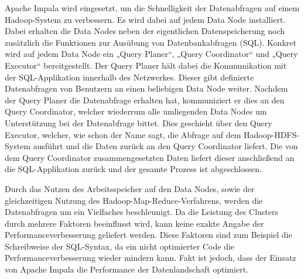 Apache Impala wird eingesetzt, um die Schnelligkeit der Datenabfragen auf einem
Hadoop-System zu verbessern. Es wird dabei auf jedem Data Node installiert.
Dabei erhalten die Data Nodes neben der eigentlichen Datenspeicherung noch
zusätzlich die Funktionen zur Ausübung von Datenbankabfragen (SQL). Konkret
wird auf jedem Data Node ein „Query Planer“, „Query Coordinator“ und „Query
Executor“ bereitgestellt. Der Query Planer hält dabei die Kommunikation mit der
SQL-Applikation innerhalb des Netzwerkes. Dieser gibt definierte Datenabfragen
von Benutzern an einen beliebigen Data Node weiter. Nachdem der Query Planer
die Datenabfrage erhalten hat, kommuniziert er dies an den Query Coordinator,
welcher wiederrum alle umliegenden Data Nodes um Unterstützung bei der
Datenabfrage bittet. Dies geschieht über den Query Executor, welcher, wie schon
der Name sagt, die Abfrage auf dem Hadoop-HDFS-System ausführt und die Daten
zurück an den Query Coordinator liefert. Die von dem Query Coordinator
zusammengesetzten Daten liefert dieser anschließend an die SQL-Applikation
zurück und der gesamte Prozess ist abgeschlossen.

Durch das Nutzen des Arbeitsspeicher auf den Data Nodes, sowie der
gleichzeitigen Nutzung des Hadoop-Map-Reduce-Verfahrens, werden die
Datenabfragen um ein Vielfaches beschleunigt. Da die Leistung des Clusters
durch mehrere Faktoren beeinflusst wird, kann keine exakte Angabe der
Performanceverbesserung geliefert werden. Diese Faktoren sind zum Beispiel die
Schreibweise der SQL-Syntax, da ein nicht optimierter Code die
Performanceverbesserung wieder mindern kann. Fakt ist jedoch, dass der Einsatz
von Apache Impala die Performance der Datenlandschaft optimiert.
\nl%

